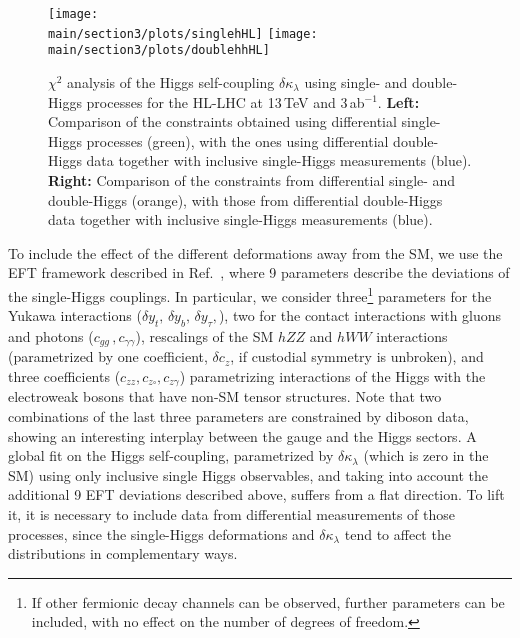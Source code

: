 \begin{figure}
	\centering
	\texttt{[image: \\main/section3/plots/singlehHL]}\hfill
	\texttt{[image: \\main/section3/plots/doublehhHL]}
	\caption{$\chi^2$ analysis of the Higgs self-coupling $\delta \kappa_\lambda$ using single- and double-Higgs processes for the HL-LHC at 13\,TeV and 3\,ab$^{-1}$. \textbf{Left:} Comparison of the constraints obtained using differential single-Higgs processes (green), with the ones using differential double-Higgs data together with inclusive single-Higgs measurements (blue). \textbf{Right:} Comparison of the constraints from differential single- and double-Higgs (orange), with those from differential double-Higgs data together with inclusive single-Higgs measurements (blue).}
	\label{fig:hllhcchi2}
\end{figure}

To include the effect of the different deformations away from the SM, we use the EFT framework described in Ref.~\cite{DiVita:2017eyz}, where 9 parameters describe the deviations of the single-Higgs couplings. In particular, we consider three\footnote{If other fermionic decay channels can be observed, further parameters can be included, with no effect on the number of degrees of freedom.} parameters for the Yukawa interactions ($\delta y_t,\,\delta y_b,\,\delta y_\tau,$), two for the contact interactions with gluons and photons ($c_{gg}\,,c_{\gamma\gamma}$), rescalings of the SM $hZZ$ and $hWW$ interactions (parametrized by one coefficient, $\delta c_z$, if custodial symmetry is unbroken), and three coefficients ($c_{zz},c_{z\square},c_{z\gamma}$) parametrizing interactions of the Higgs with the electroweak bosons that have non-SM tensor structures. Note that two combinations of the last three parameters are constrained by diboson data, showing an interesting interplay between the gauge and the Higgs sectors. A global fit on the Higgs self-coupling, parametrized by $\delta\kappa_\lambda$ (which is zero in the SM) using only inclusive single Higgs observables, and taking into account the additional 9 EFT deviations described above, suffers from a flat direction. To lift it, it is necessary to include data from differential measurements of those processes, since the single-Higgs deformations and $\delta\kappa_\lambda$ tend to affect the distributions in complementary ways.
\medskip

